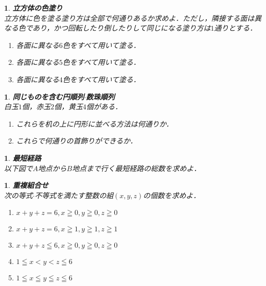 \documentclass[10pt,
fleqn,
dvipdfmx,
uplatex
]{jsarticle}
\newtheorem{question}[Question]{}
\begin{document}
\begin{question}{\bf\boldmath 立方体の色塗り}\\
立方体に色を塗る塗り方は全部で何通りあるか求めよ．ただし，隣接する面は異なる色であり，かつ回転したり倒したりして同じになる塗り方は$1$通りとする．
\begin{enumerate}
\item 各面に異なる$6$色をすべて用いて塗る．
\item 各面に異なる$5$色をすべて用いて塗る．
\item 各面に異なる$4$色をすべて用いて塗る．
\end{enumerate}

\end{question}



\begin{question}{\bf\boldmath 同じものを含む円順列$\cdot$数珠順列}\\
白玉$1$個，赤玉$2$個，黄玉$4$個がある．
\begin{enumerate}
\item これらを机の上に円形に並べる方法は何通りか．
\item これらで何通りの首飾りができるか．
\end{enumerate}

\end{question}



\begin{question}{\bf\boldmath 最短経路}\\
以下図で$A$地点から$B$地点まで行く最短経路の総数を求めよ．
\end{question}



\begin{question}{\bf\boldmath 重複組合せ}\\
次の等式$\cdot$不等式を満たす整数の組$\left(x, y, z\right)$の個数を求めよ．
\begin{enumerate}
\item $x+y+z=6, x\geqq 0, y\geqq 0, z\geqq 0$
\item $x+y+z=6, x\geqq 1, y\geqq 1, z\geqq 1$
\item $x+y+z\leqq 6, x\geqq 0, y\geqq 0, z\geqq 0$
\item $1\leqq x<y<z\leqq 6$
\item $1\leqq x\leqq y\leqq z\leqq 6$
\end{enumerate}

\end{question}
\end{document}
